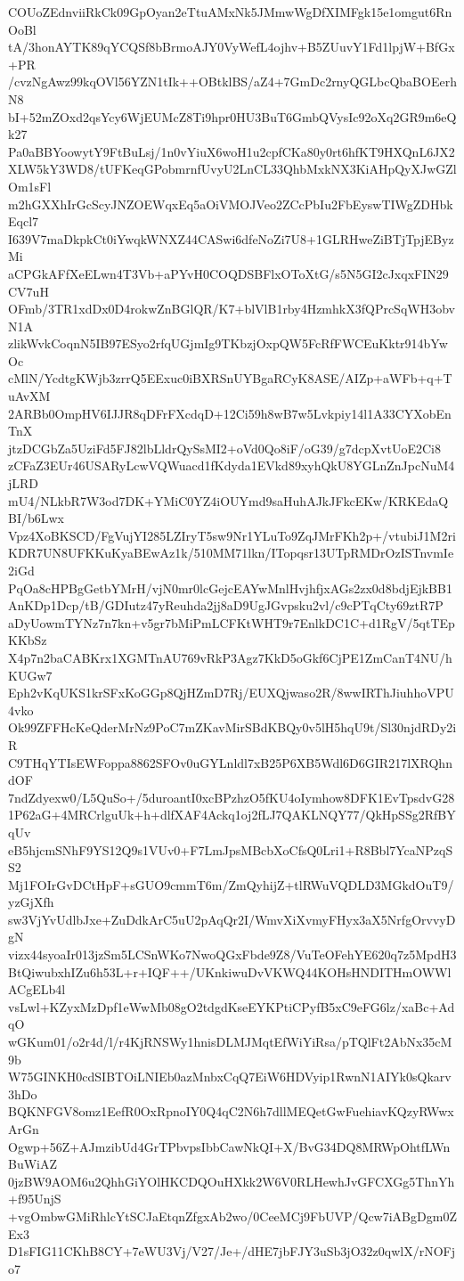 COUoZEdnviiRkCk09GpOyan2eTtuAMxNk5JMmwWgDfXIMFgk15e1omgut6RnOoBl
tA/3honAYTK89qYCQSf8bBrmoAJY0VyWefL4ojhv+B5ZUuvY1Fd1lpjW+BfGx+PR
/cvzNgAwz99kqOVl56YZN1tIk++OBtklBS/aZ4+7GmDc2rnyQGLbcQbaBOEerhN8
bI+52mZOxd2qsYcy6WjEUMcZ8Ti9hpr0HU3BuT6GmbQVysIc92oXq2GR9m6eQk27
Pa0aBBYoowytY9FtBuLsj/1n0vYiuX6woH1u2cpfCKa80y0rt6hfKT9HXQnL6JX2
XLW5kY3WD8/tUFKeqGPobmrnfUvyU2LnCL33QhbMxkNX3KiAHpQyXJwGZlOm1sFl
m2hGXXhIrGcScyJNZOEWqxEq5aOiVMOJVeo2ZCcPbIu2FbEyswTIWgZDHbkEqcl7
I639V7maDkpkCt0iYwqkWNXZ44CASwi6dfeNoZi7U8+1GLRHweZiBTjTpjEByzMi
aCPGkAFfXeELwn4T3Vb+aPYvH0COQDSBFlxOToXtG/s5N5GI2cJxqxFIN29CV7uH
OFmb/3TR1xdDx0D4rokwZnBGlQR/K7+blVlB1rby4HzmhkX3fQPrcSqWH3obvN1A
zlikWvkCoqnN5IB97ESyo2rfqUGjmIg9TKbzjOxpQW5FcRfFWCEuKktr914bYwOc
cMlN/YcdtgKWjb3zrrQ5EExuc0iBXRSnUYBgaRCyK8ASE/AIZp+aWFb+q+TuAvXM
2ARBb0OmpHV6IJJR8qDFrFXcdqD+12Ci59h8wB7w5Lvkpiy14l1A33CYXobEnTnX
jtzDCGbZa5UziFd5FJ82lbLldrQySsMI2+oVd0Qo8iF/oG39/g7dcpXvtUoE2Ci8
zCFaZ3EUr46USARyLcwVQWuacd1fKdyda1EVkd89xyhQkU8YGLnZnJpcNuM4jLRD
mU4/NLkbR7W3od7DK+YMiC0YZ4iOUYmd9saHuhAJkJFkcEKw/KRKEdaQBI/b6Lwx
Vpz4XoBKSCD/FgVujYI285LZIryT5sw9Nr1YLuTo9ZqJMrFKh2p+/vtubiJ1M2ri
KDR7UN8UFKKuKyaBEwAz1k/510MM71lkn/ITopqsr13UTpRMDrOzISTnvmIe2iGd
PqOa8cHPBgGetbYMrH/vjN0mr0lcGejcEAYwMnlHvjhfjxAGs2zx0d8bdjEjkBB1
AnKDp1Dcp/tB/GDIutz47yReuhda2jj8aD9UgJGvpsku2vl/c9cPTqCty69ztR7P
aDyUowmTYNz7n7kn+v5gr7bMiPmLCFKtWHT9r7EnlkDC1C+d1RgV/5qtTEpKKbSz
X4p7n2baCABKrx1XGMTnAU769vRkP3Agz7KkD5oGkf6CjPE1ZmCanT4NU/hKUGw7
Eph2vKqUKS1krSFxKoGGp8QjHZmD7Rj/EUXQjwaso2R/8wwIRThJiuhhoVPU4vko
Ok99ZFFHcKeQderMrNz9PoC7mZKavMirSBdKBQy0v5lH5hqU9t/Sl30njdRDy2iR
C9THqYTIsEWFoppa8862SFOv0uGYLnldl7xB25P6XB5Wdl6D6GIR217lXRQhndOF
7ndZdyexw0/L5QuSo+/5duroantI0xcBPzhzO5fKU4oIymhow8DFK1EvTpsdvG28
1P62aG+4MRCrlguUk+h+dlfXAF4Ackq1oj2fLJ7QAKLNQY77/QkHpSSg2RfBYqUv
eB5hjcmSNhF9YS12Q9s1VUv0+F7LmJpsMBcbXoCfsQ0Lri1+R8Bbl7YcaNPzqSS2
Mj1FOIrGvDCtHpF+sGUO9cmmT6m/ZmQyhijZ+tlRWuVQDLD3MGkdOuT9/yzGjXfh
sw3VjYvUdlbJxe+ZuDdkArC5uU2pAqQr2I/WmvXiXvmyFHyx3aX5NrfgOrvvyDgN
vizx44syoaIr013jzSm5LCSnWKo7NwoQGxFbde9Z8/VuTeOFehYE620q7z5MpdH3
BtQiwubxhIZu6h53L+r+IQF++/UKnkiwuDvVKWQ44KOHsHNDITHmOWWlACgELb4l
vsLwl+KZyxMzDpf1eWwMb08gO2tdgdKseEYKPtiCPyfB5xC9eFG6lz/xaBc+AdqO
wGKum01/o2r4d/l/r4KjRNSWy1hnisDLMJMqtEfWiYiRsa/pTQlFt2AbNx35cM9b
W75GINKH0cdSIBTOiLNIEb0azMnbxCqQ7EiW6HDVyip1RwnN1AIYk0sQkarv3hDo
BQKNFGV8omz1EefR0OxRpnoIY0Q4qC2N6h7dllMEQetGwFuehiavKQzyRWwxArGn
Ogwp+56Z+AJmzibUd4GrTPbvpsIbbCawNkQI+X/BvG34DQ8MRWpOhtfLWnBuWiAZ
0jzBW9AOM6u2QhhGiYOlHKCDQOuHXkk2W6V0RLHewhJvGFCXGg5ThnYh+f95UnjS
+vgOmbwGMiRhlcYtSCJaEtqnZfgxAb2wo/0CeeMCj9FbUVP/Qcw7iABgDgm0ZEx3
D1sFIG11CKhB8CY+7eWU3Vj/V27/Je+/dHE7jbFJY3uSb3jO32z0qwlX/rNOFjo7
